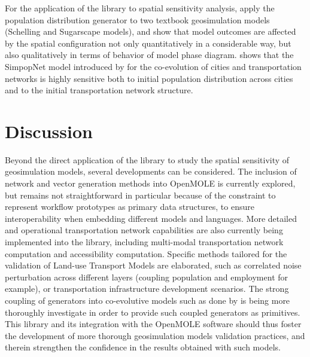 \documentclass[11pt]{article}
\begin{document}
For the application of the library to spatial sensitivity analysis, \cite{raimbault2019space} apply the population distribution generator to two textbook geosimulation models (Schelling and Sugarscape models), and show that model outcomes are affected by the spatial configuration not only quantitatively in a considerable way, but also qualitatively in terms of behavior of model phase diagram. \cite{raimbault2020unveiling} shows that the SimpopNet model introduced by \cite{schmitt2014modelisation} for the co-evolution of cities and transportation networks is highly sensitive both to initial population distribution across cities and to the initial transportation network structure.


\section{Discussion}


Beyond the direct application of the library to study the spatial sensitivity of geosimulation models, several developments can be considered. The inclusion of network and vector generation methods into OpenMOLE is currently explored, but remains not straightforward in particular because of the constraint to represent workflow prototypes as primary data structures, to ensure interoperability when embedding different models and languages. More detailed and operational transportation network capabilities are also currently being implemented into the library, including multi-modal transportation network computation and accessibility computation. Specific methods tailored for the validation of Land-use Transport Models are elaborated, such as correlated noise perturbation across different layers (coupling population and employment for example), or transportation infrastructure development scenarios. The strong coupling of generators into co-evolutive models such as done by \cite{raimbault2019urban} is being more thoroughly investigate in order to provide such coupled generators as primitives. This library and its integration with the OpenMOLE software should thus foster the development of more thorough geosimulation models validation practices, and therein strengthen the confidence in the results obtained with such models.



\end{document}
